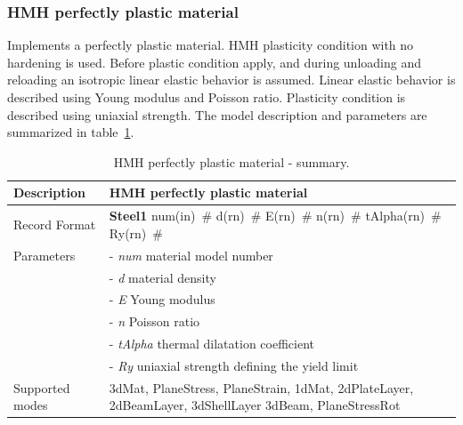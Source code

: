 \documentclass[epsf,a4paper]{article}
\newcommand{\descitem}[1]{{\noindent \bf #1}}
\newcommand{\elemparam}[2]{{{#1\tiny (#2)}~\#}}
\newcommand{\param}[1]{{\it #1}}
\begin{document}
\subsubsection{HMH perfectly plastic material}

Implements a perfectly plastic material. 
HMH plasticity condition with no hardening is used. 
Before plastic condition apply, and during unloading and reloading an
isotropic linear elastic behavior is assumed. Linear elastic behavior
is described using Young modulus and Poisson ratio. Plasticity
condition is described using uniaxial strength. 
The model description and parameters are summarized
in table~\ref{Steel1_table}.

\begin{table}[h]                                                                
\begin{tabular}{|l|p{9cm}|}                                                      
\hline                                                                          
Description & HMH perfectly plastic material\\
\hline                                                                          
Record Format & \descitem{Steel1} \elemparam{num}{in}
\elemparam{d}{rn} \elemparam{E}{rn} \elemparam{n}{rn}
\elemparam{tAlpha}{rn} \elemparam{Ry}{rn}\\
Parameters &- \param{num} material model number\\
&- \param{d} material density\\
&- \param{E} Young modulus\\
&- \param{n} Poisson ratio\\
&- \param{tAlpha} thermal dilatation coefficient\\
&- \param{Ry} uniaxial strength defining the yield limit\\
Supported modes& 3dMat, PlaneStress, PlaneStrain, 1dMat,
2dPlateLayer, 2dBeamLayer, 3dShellLayer
3dBeam, PlaneStressRot\\
\hline
\end{tabular}                                                                   
\caption{HMH perfectly plastic material - summary.}                
\label{Steel1_table}                                                         
\end{table}                                                                     
\end{document}
